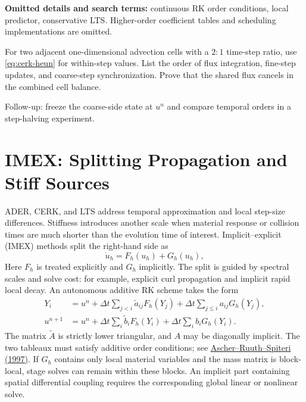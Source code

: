 \documentclass[11pt,openany]{book}
\numberwithin{equation}{chapter}
\theoremstyle{definition}
\theoremstyle{remark}
\begin{document}
\begin{askai}
\textbf{Omitted details and search terms:} continuous RK order conditions, local predictor, conservative LTS. Higher-order coefficient tables and scheduling implementations are omitted.

For two adjacent one-dimensional advection cells with a $2:1$ time-step ratio, use \eqref{eq:cerk-heun} for within-step values.
List the order of flux integration, fine-step updates, and coarse-step synchronization.
Prove that the shared flux cancels in the combined cell balance.

Follow-up: freeze the coarse-side state at $u^n$ and compare temporal orders in a step-halving experiment.
\end{askai}

\section{IMEX: Splitting Propagation and Stiff Sources}\label{sec:imex}
ADER, CERK, and LTS address temporal approximation and local step-size differences.
Stiffness introduces another scale when material response or collision times are much shorter than the evolution time of interest.
Implicit--explicit (IMEX) methods split the right-hand side as
\begin{equation}\label{eq:imex-split}
\dot u_h=F_h(u_h)+G_h(u_h),
\end{equation}
Here $F_h$ is treated explicitly and $G_h$ implicitly. The split is guided by spectral scales and solve cost:
for example, explicit curl propagation and implicit rapid local decay.
An autonomous additive RK scheme takes the form
\begin{equation}\label{eq:imex-rk}
\begin{aligned}
Y_i&=u^n+\Delta t\sum_{j<i}\widetilde a_{ij}F_h(Y_j)
           +\Delta t\sum_{j\le i}a_{ij}G_h(Y_j),\\
u^{n+1}&=u^n+\Delta t\sum_i\widetilde b_iF_h(Y_i)
              +\Delta t\sum_i b_iG_h(Y_i).
\end{aligned}
\end{equation}
The matrix $\widetilde A$ is strictly lower triangular, and $A$ may be diagonally implicit.
The two tableaux must satisfy additive order conditions; see
\href{https://doi.org/10.1016/S0168-9274(97)00056-1}{Ascher--Ruuth--Spiteri (1997)}.
If $G_h$ contains only local material variables and the mass matrix is block-local, stage solves can remain within these blocks.
An implicit part containing spatial differential coupling requires the corresponding global linear or nonlinear solve.
\end{document}
